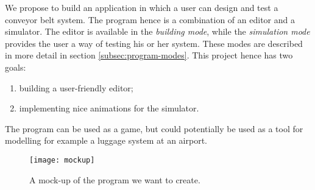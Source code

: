 We propose to build an application in which a user can design and test a conveyor belt system. The program hence is a combination of an editor and a simulator. The editor is available in the \textit{building mode}, while the \textit{simulation mode} provides the user a way of testing his or her system. These modes are described in more detail in section \ref{subsec:program-modes}. This project hence has two goals:
\begin{enumerate}
  \item building a user-friendly editor;
  \item implementing nice animations for the simulator.
\end{enumerate}
The program can be used as a game, but could potentially be used as a tool for modelling for example a luggage system at an airport.

\begin{figure}
  \begin{center}
    \texttt{[image: mockup]}
    \caption{A mock-up of the program we want to create.}
    \label{fig:mockup}
  \end{center}
\end{figure}
